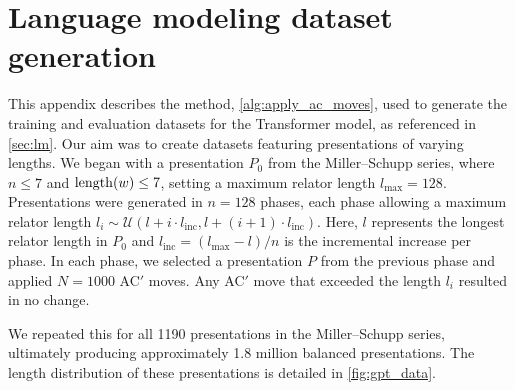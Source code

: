 
\section{Language modeling dataset generation \label{app:algorithm}}

This appendix describes the method, \autoref{alg:apply_ac_moves}, used to generate the training and evaluation datasets for the Transformer model, as referenced in \autoref{sec:lm}. Our aim was to create datasets featuring presentations of varying lengths. We began with a presentation \(P_0\) from the Miller--Schupp series, where $n \leq 7$ and $\operatorname{length}(w) \leq 7$, setting a maximum relator length \(l_{\text{max}} = 128\). Presentations were generated in \(n=128\) phases, each phase allowing a maximum relator length \(l_i \sim \mathcal{U}(l + i \cdot l_{\text{inc}}, l + (i+1) \cdot l_{\text{inc}})\). Here, \(l\) represents the longest relator length in \(P_0\) and \(l_{\text{inc}} = (l_{\text{max}} - l)/n\) is the incremental increase per phase. In each phase, we selected a presentation \(P\) from the previous phase and applied \(N=1000\) AC$'$ moves. Any AC$'$ move that exceeded the length \(l_i\) resulted in no change.

We repeated this for all 1190 presentations in the Miller--Schupp series, ultimately producing approximately 1.8 million balanced presentations. The length distribution of these presentations is detailed in \autoref{fig:gpt_data}.

